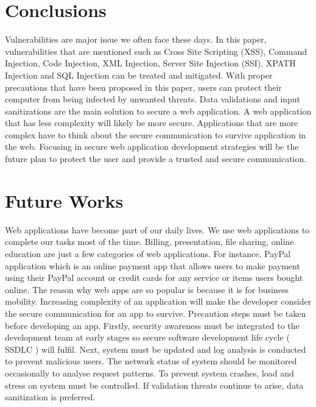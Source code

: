 \documentclass[a4paper,12pt]{article}
\begin{document}
\section{Conclusions}
Vulnerabilities are major issue we often face these days. In this paper, vulnerabilities that are mentioned such as Cross Site Scripting (XSS), Command Injection, Code Injection, XML Injection, Server Site Injection (SSI), XPATH Injection and SQL Injection can be treated and mitigated. With proper precautions that have been proposed in this paper, users can protect their computer from being infected by unwanted threats. Data validations and input sanitizations are the main solution to secure a web application. A web application that has less complexity will likely be more secure.  Applications that are more complex have to think about the secure communication to survive application in the web. Focusing in secure web application development strategies will be the future plan to protect the user and provide a trusted and secure communication.
\section{Future Works}
Web applications have become part of our daily lives. We use web applications to complete our tasks most of the time. Billing, presentation, file sharing, online education are just a few categories of web applications. For instance, PayPal application which is an online payment app that allows users to make payment using their PayPal account or credit cards for any service or items users bought online. The reason why web apps are so popular is because it is for business mobility. Increasing complexity of an application will make the developer consider the secure communication for an app to survive. Precaution steps must be taken before developing an app. Firstly, security awareness must be integrated to the development team at early stages so secure software development life cycle ( SSDLC ) will fulfil. Next, system must be updated and log analysis is conducted to prevent malicious users. The network status of system should be monitored occasionally to analyse request patterns. To prevent system crashes, load and stress on system must be controlled. If validation threats continue to arise, data sanitization is preferred. 
\end{document}

